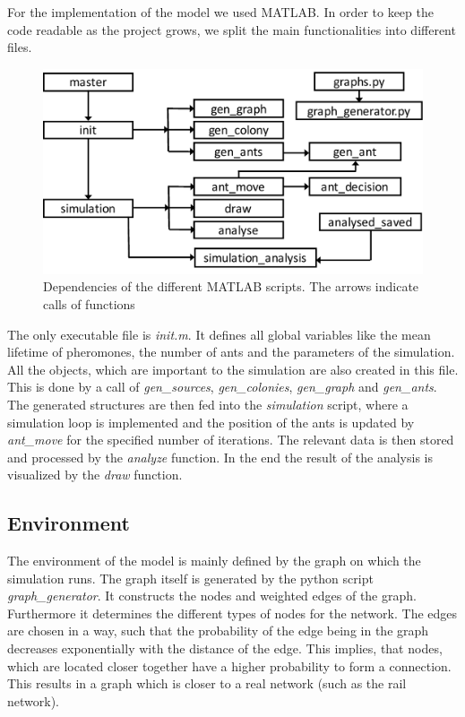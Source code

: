 For the implementation of the model we used MATLAB. In order to keep the code readable as the project grows, we split the main functionalities into different files.
\begin{figure}[H]
	\centering
	\includegraphics[scale=0.5]{Dependencies.pdf}
	\caption{Dependencies of the different MATLAB scripts. The arrows indicate calls of functions}
\end{figure}
The only executable file is \textit{init.m}. It defines all global variables like the mean lifetime of pheromones, the number of ants and the parameters of the simulation. All the objects, which are important to the simulation are also created in this file. This is done by a call of \textit{gen\_sources}, \textit{gen\_colonies}, \textit{gen\_graph} and \textit{gen\_ants}. The generated structures are then fed into the \textit{simulation} script, where a simulation loop is implemented and the position of the ants is updated by \textit{ant\_move} for the specified number of iterations. The relevant data is then stored and processed by the \textit{analyze} function. In the end the result of the analysis is visualized by the \textit{draw} function.
\subsection{Environment}
The environment of the model is mainly defined by the graph on which the simulation runs. 
The graph itself is generated by the python script \textit{graph\_generator}. It constructs the nodes and weighted edges of the graph. Furthermore it determines the different types of nodes for the network. The edges are chosen in a way, such that the probability of the edge being in the graph decreases exponentially with the distance of the edge. This implies, that nodes, which are located closer together have a higher probability to form a connection. This results in a graph which is closer to a real network (such as the rail network).

